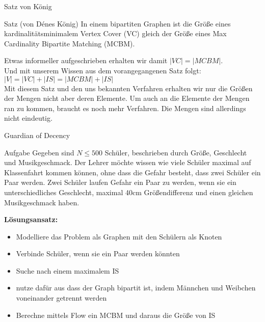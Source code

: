 \begin{frame}{Satz von König}
	\begin{block}{Satz (von Dénes König)}
		In einem bipartiten Graphen ist die Größe eines kardinalitätsminimalem Vertex Cover (VC) gleich der Größe eines Max Cardinality Bipartite Matching (MCBM).
	\end{block}
	\pause
	Etwas informeller aufgeschrieben erhalten wir damit $|VC| = |MCBM|$.\\
	Und mit unserem Wissen aus dem vorangegangenen Satz folgt: $|V| = |VC| + |IS| = |MCBM| + |IS|$\\
	\pause
	\vspace{0.5cm}
	Mit diesem Satz und den uns bekannten Verfahren erhalten wir nur die Größen der Mengen nicht aber deren Elemente. Um auch an die Elemente der Mengen ran zu kommen, braucht es noch mehr Verfahren. Die Mengen sind allerdings nicht eindeutig.
\end{frame}

\begin{frame}{Guardian of Decency}
	\vspace{-0.3cm}
	\begin{block}{Aufgabe}
		Gegeben sind $N\leq 500$ Schüler, beschrieben durch Größe, Geschlecht und Musikgeschmack. Der Lehrer möchte wissen wie viele Schüler maximal auf Klassenfahrt kommen können, ohne dass die Gefahr besteht, dass zwei Schüler ein Paar werden.
		Zwei Schüler laufen Gefahr ein Paar zu werden, wenn sie ein unterschiedliches Geschlecht, maximal 40cm Größendifferenz und einen gleichen Musikgeschmack haben.
	\end{block}
	\pause
	\textbf{Lösungsansatz:}
	\begin{itemize}
		\setlength\itemsep{0.05em}
		\item Modelliere das Problem als Graphen mit den Schülern als Knoten
		\item Verbinde Schüler, wenn sie ein Paar werden könnten
		\pause
		\item Suche nach einem maximalem IS
		\pause
		\item nutze dafür aus dass der Graph bipartit ist, indem Männchen und Weibchen voneinander getrennt werden
		\item Berechne mittels Flow ein MCBM und daraus die Größe von IS
	\end{itemize}
\end{frame}
